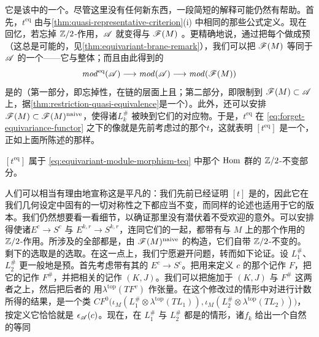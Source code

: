 它是该\trCategory{}中的一个\trIsomorphism。尽管这里没有任何新东西，一段简短的解释可能仍然有帮助。首先，$t^{\mathrm{eq}}$ 由与\cref{thm:quasi-representative-criterion}(i) 中相同的那些公式定义。现在回忆，若忘掉 $\mathbb{Z}/2$-作用，$\mathscr{A}$ 就变得与 $\mathscr{F}(M)$ \trQuasiequivalent。更精确地说，通过把每个\trLagrange\trBrane{}做成预\trEquivariant\trBrane（这总是可能的，见\cref{thm:equivariant-brane-remark}），我们可以把 $\mathscr{F}(M)$ 等同于 $\mathscr{A}$ 的一个\trFullSubcategory{}——它与整体\trQuasiequivalent；而且由此得到的\trFunctor
\begin{equation}\label{eq:forget-equivariance-functor}
\mathit{mod}^{\mathrm{eq}}(\mathscr{A})\longrightarrow\mathit{mod}(\mathscr{A})\longrightarrow\mathit{mod}(\mathscr{F}(M))
\end{equation}
是\trCohomology\trFullyFaithful{}的（第一部分，即忘掉\trEquivariant{}性，在链的层面上\trFull{}且\trFaithful；第二部分，即限制到 $\mathscr{F}(M)\subset\mathscr{A}$ 上，据\cref{thm:restriction-quasi-equivalence}是一个\trQuasiequivalence）。此外，还可以安排\trEmbedding{}$\mathscr{F}(M)\subset\mathscr{F}(M)^{\mathrm{naive}}$，使得诸\trLagrange\trBrane{}$L^{\#}_k$ 被映到它们\trEquivariant{}的对应物。于是，$t^{\mathrm{eq}}$ 在 \eqref{eq:forget-equivariance-functor} 之下的像就是先前考虑过的那个\trModule{}\trHomomorphism{}$t$，这就表明 $[t^{\mathrm{eq}}]$ 是一个\trIsomorphism，正如上面所陈述的那样。
\begin{lemma}\label{thm:teq-invariant-part}
$[t^{\mathrm{eq}}]$ 属于 \eqref{eq:equivariant-module-morphism-teq} 中那个 $\operatorname{Hom}$ 群的 $\mathbb{Z}/2$-不变部分。
\end{lemma}
人们可以相当有理由地宣称这是平凡的：我们先前已经证明 $[t]$ 是\trCanonical{}的，因此它在我们几何设定中固有的一切对称性之下都应当不变，而同样的论述也适用于它的\trEquivariant{}版本。我们仍然想要看一看细节，以确证那里没有潜伏着不受欢迎的意外。可以安排得使诸\trLefschetzFibration{}$E^c\to S^c$ 与 $E^{k,r}\to S^{k,r}$，连同它们的\trBoundaryCondition{}一起，都带有与 $M$ 上的那个作用\trCompatible{}的\trFibrewise{} $\mathbb{Z}/2$-作用。所涉及的全部\trLagrange\trSubmanifold{}都是\trEquivariant\trBrane，由 $\mathscr{F}(M)^{\mathrm{naive}}$ 的构造，它们自带 $\mathbb{Z}/2$-不变的\trFloerDatum。剩下的选取是\trRelative\trPerturbationDatum{}的选取。在这一点上，我们宁愿避开\trEquivariant\trTransversality{}问题，转而如下论证。设 $L^{\#}_1$、$L^{\#}_2$ 更一般地是预\trEquivariant\trBrane。首先考虑带有其\trFibrewise\trInvolution{}的 $E^c\to S^c$。把用来定义 $c$ 的那个\trLagrange\trBoundaryCondition{}记作 $F$，把它的\trRelative\trBraneStructure{}记作 $F^{\#}$，并把相关的\trRelative\trPerturbationDatum{}记作 $(K,J)$。我们可以把\trFibrewise\trInvolution{}施加于 $(K,J)$ 与 $F^{\#}$ 这两者之上，然后把后者的 \trPinStructure{}用\trLineBundle{}$\lambda^{\mathrm{top}}(TF^v)$ 作张量。在这个修改过的情形中对\trInhomogeneous\trPseudoholomorphic\trSection{}进行计数所得的结果，是一个类 $CF^0\bigl(\iota_M(L^{\#}_1\otimes\lambda^{\mathrm{top}}(TL_1)),\iota_M(L^{\#}_2\otimes\lambda^{\mathrm{top}}(TL_2))\bigr)$，按定义它恰恰就是 $\epsilon_{\mathscr{A}}(c)$。现在，在 $L^{\#}_1$ 与 $L^{\#}_2$ 都是\trEquivariant\trBrane{}的情形，诸\trIsomorphism{}$f_k$ 给出一个自然的等同
